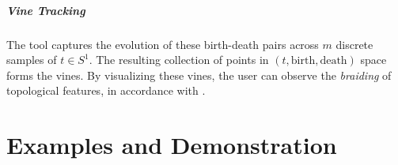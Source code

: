 \documentclass[a4paper,english,numberwithinsect]{eurocg26-submission}
\begin{document}
\subparagraph{Vine Tracking}
The tool captures the evolution of these birth-death pairs across $m$ discrete samples of $t \in S^1$. The resulting collection of points in $(t, \text{birth}, \text{death})$ space forms the vines. By visualizing these vines, the user can observe the \textit{braiding} of topological features, in accordance with \cite{chambers2025braidingvineyards}.


    
    



\section{Examples and Demonstration}
\end{document}
